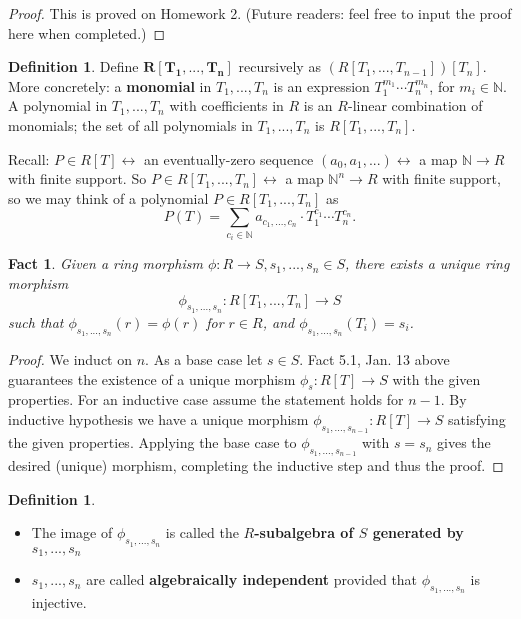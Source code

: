 \documentclass{amsart}
\newcommand{\NN}{\mathbb{N}}
\newtheorem{fact}[thm]{Fact}
\theoremstyle{definition}
\newtheorem{defn}[thm]{Definition}
\theoremstyle{remark}
\begin{document}
\begin{proof}
This is proved on Homework 2. (Future readers: feel free to input the proof here when completed.)
\end{proof}

\begin{defn}
Define $\mathbf{R[T_1, ..., T_n]}$ recursively as $(R[T_1, ..., T_{n-1}])[T_n]$. More concretely: a \textbf{monomial} in $T_1, ..., T_n$ is an expression $T_1^{m_1} \cdots T_n^{m_n}$, for $m_i \in \NN$. A polynomial in $T_1, ..., T_n$ with coefficients in $R$ is an $R$-linear combination of monomials; the set of all polynomials in $T_1, ..., T_n$ is $R[T_1, ..., T_n]$.
\end{defn}

Recall: $P \in R[T] \leftrightarrow$ an eventually-zero sequence $(a_0, a_1, ...) \leftrightarrow$ a map $\NN \rightarrow R$ with finite support. So $P \in R[T_1, ..., T_n] \leftrightarrow$ a map $\NN^n \rightarrow R$ with finite support, so we may think of a polynomial $P \in R[T_1, ..., T_n]$ as
\[P(T) = \sum_{c_i \in \NN} a_{c_1, ..., c_n} \cdot T_1^{c_1} \cdots T_n^{c_n}.\]

\begin{fact}
Given a ring morphism $\phi \colon R \rightarrow S, s_1, ..., s_n \in S$, there exists a unique ring morphism \[\phi_{s_1, ..., s_n} \colon R[T_1, ..., T_n] \rightarrow S\] such that $\phi_{s_1, ..., s_n}(r) = \phi(r)$ for $r \in R$, and $\phi_{s_1, ..., s_n}(T_i) = s_i$.
\end{fact}
\begin{proof}
We induct on $n$. As a base case let $s \in S$. Fact 5.1, Jan. 13 above guarantees the existence of a unique morphism $\phi_s \colon R[T] \rightarrow S$ with the given properties. For an inductive case assume the statement holds for $n - 1$. By inductive hypothesis we have a unique morphism $\phi_{s_1, ..., s_{n-1}} \colon R[T] \rightarrow S$ satisfying the given properties. Applying the base case to $\phi_{s_1, ..., s_{n-1}}$ with $s = s_n$ gives the desired (unique) morphism, completing the inductive step and thus the proof.
\end{proof}

\begin{defn} \hspace{0.5cm}
\begin{itemize}
\item The image of $\phi_{s_1, ..., s_n}$ is called the \textbf{$R$-subalgebra of $S$ generated by $s_1, ..., s_n$}
\item $s_1, ..., s_n$ are called \textbf{algebraically independent} provided that $\phi_{s_1, ..., s_n}$ is injective.
\end{itemize}
\end{defn}
\end{document}
